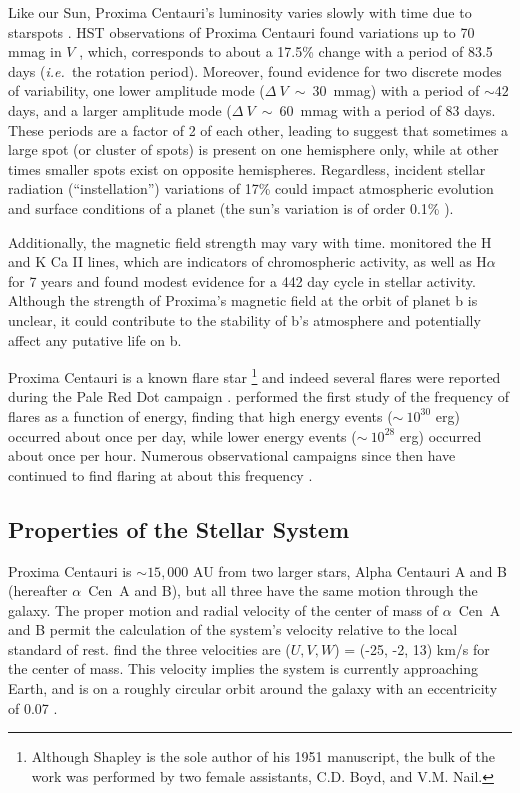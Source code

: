 \documentclass[preprint,12pt]{aastex}
\def\ie{{\it i.e.\ }}
\def\acen{{$\alpha$~Cen}}
\begin{document}
Like our Sun, Proxima Centauri's luminosity varies slowly with time
due to starspots \citep{Benedict93}. HST observations of Proxima
Centauri found variations up to 70 mmag in $V$ \citep{Benedict98},
which, corresponds to about a 17.5\% change with a period of 83.5 days
(\ie the rotation period). Moreover, \citep{Benedict98} found evidence
for two discrete modes of variability, one lower amplitude mode
($\Delta~V~\sim~30$~mmag) with a period of $\sim 42$ days, and a
larger amplitude mode ($\Delta~V~\sim~60$~mmag with a period of 83
days. These periods are a factor of 2 of each other, leading
\cite{Benedict98} to suggest that sometimes a large spot (or cluster
of spots) is present on one hemisphere only, while at other times
smaller spots exist on opposite hemispheres. Regardless, incident
stellar radiation (``instellation'') variations of 17\% could impact
atmospheric evolution and surface conditions of a planet (the sun's
variation is of order 0.1\% \citep{Willson81}).

Additionally, the magnetic field strength may vary with
time. \cite{Cincunegui07} monitored the H and K Ca II lines, which are
indicators of chromospheric activity, as well as H$\alpha$ for 7 years
and found modest evidence for a 442 day cycle in stellar
activity. Although the strength of Proxima's magnetic
field at the orbit of planet b is unclear, it could contribute to the stability
of b's atmosphere and potentially affect any putative life on b.

Proxima Centauri is a known flare star
\citep{Shapley51}\footnote{Although Shapley is the sole author of his
  1951 manuscript, the bulk of the work was performed by two female
  assistants, C.D. Boyd, and V.M. Nail.}  and indeed several flares
were reported during the Pale Red Dot campaign
\citep{AngladaEscude16}. \cite{Walker81} performed the first study of
the frequency of flares as a function of energy, finding that high
energy events ($\sim~10^{30}$ erg) occurred about once per day, while
lower energy events ($\sim~10^{28}$ erg) occurred about once per
hour. Numerous observational campaigns since then have continued to
find flaring at about this frequency
\citep{Benedict98,AngladaEscude16}.

\subsection{Properties of the Stellar System}
\label{sec:models:stellarsys}
Proxima Centauri is $\sim 15,000$ AU from two larger stars, Alpha
Centauri A and B (hereafter \acen~A and B), but all three have the
same motion through the galaxy. The proper motion and radial
velocity of the center of mass of \acen~A and B permit the calculation
of the system's velocity relative to the local standard of
rest. \cite{Poveda96} find the three velocities are ($U, V, W$) =
(-25, -2, 13) km/s for the center of mass. This velocity implies the
system is currently approaching Earth, and is on a roughly circular
orbit around the galaxy with an eccentricity of 0.07
\citep{AllenHerrera98}.
\end{document}
